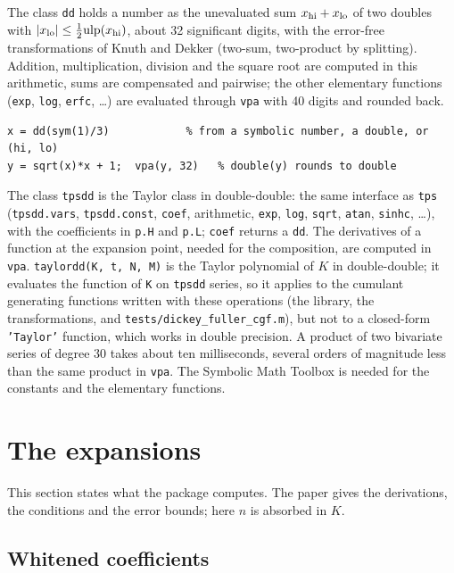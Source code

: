 \documentclass[11pt]{article}
\newcommand{\prog}[1]{\texttt{#1}}
\begin{document}
The class \prog{dd} holds a number as the unevaluated sum $x_{\rm hi}+x_{\rm lo}$ of two doubles with
$|x_{\rm lo}|\leq\frac12\mathrm{ulp}(x_{\rm hi})$, about 32 significant digits, with the error-free
transformations of Knuth and Dekker (two-sum, two-product by splitting). Addition, multiplication,
division and the square root are computed in this arithmetic, sums are compensated and pairwise; the
other elementary functions (\prog{exp}, \prog{log}, \prog{erfc}, \ldots) are evaluated through
\prog{vpa} with 40 digits and rounded back.
\begin{lstlisting}
x = dd(sym(1)/3)            % from a symbolic number, a double, or (hi, lo)
y = sqrt(x)*x + 1;  vpa(y, 32)   % double(y) rounds to double
\end{lstlisting}
The class \prog{tpsdd} is the Taylor class in double-double: the same interface as \prog{tps}
(\prog{tpsdd.vars}, \prog{tpsdd.const}, \prog{coef}, arithmetic, \prog{exp}, \prog{log}, \prog{sqrt},
\prog{atan}, \prog{sinhc}, \ldots), with the coefficients in \prog{p.H} and \prog{p.L}; \prog{coef}
returns a \prog{dd}. The derivatives of a function at the expansion point, needed for the composition,
are computed in \prog{vpa}. \prog{taylordd(K, t, N, M)} is the Taylor polynomial of $K$ in
double-double; it evaluates the function of \prog{K} on \prog{tpsdd} series, so it applies to the
cumulant generating functions written with these operations (the library, the transformations, and
\prog{tests/dickey\_fuller\_cgf.m}), but not to a closed-form \prog{'Taylor'} function, which works in
double precision. A product of two bivariate series of degree 30 takes about ten milliseconds,
several orders of magnitude less than the same product in \prog{vpa}. The Symbolic Math Toolbox is needed for the constants and the elementary
functions.

\section{The expansions}\label{sec:background}

This section states what the package computes. The paper gives the derivations, the conditions and
the error bounds; here $n$ is absorbed in $K$.

\subsection{Whitened coefficients}
\end{document}
